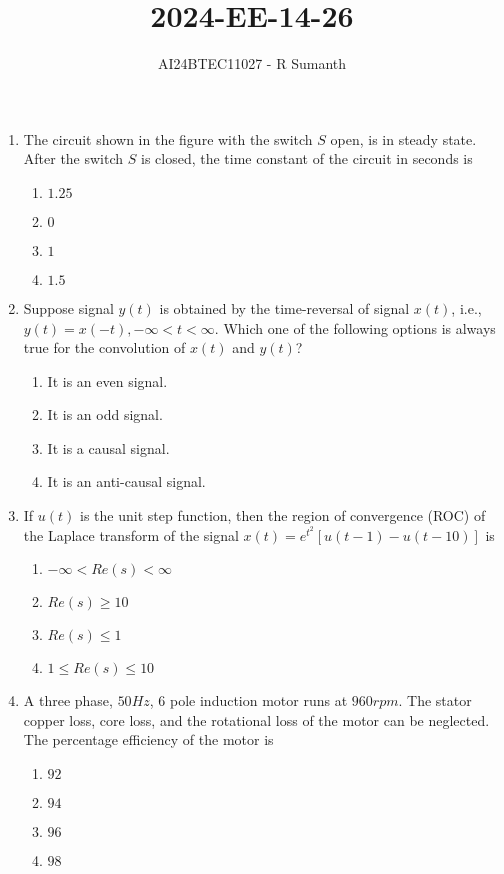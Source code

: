\documentclass[journal,12pt,onecolumn]{IEEEtran}
\theoremstyle{remark}
\begin{document}

\vspace{3cm}

\title{\textbf{2024-EE-14-26}}
\author{AI24BTEC11027 - R Sumanth}
\maketitle
\bigskip

\renewcommand{\thefigure}{\theenumi}
\renewcommand{\thetable}{\theenumi}
\setlength{\columnsep}{2.5em}
\begin{enumerate}

\item The circuit shown in the figure with the switch $S$ open, is in steady state. After the 
switch $S$ is closed, the time constant of the circuit in seconds is

\begin{enumerate}
    \item $1.25$
    \item $0$
    \item $1$
    \item $1.5$\\
\end{enumerate}

\item Suppose signal $y(t)$ is obtained by the time-reversal of signal $x(t)$, i.e., $y(t)=x(-t),-\infty<t<\infty.$ Which one of the following options is always true for the convolution of $x(t)$ and $y(t)$?
\begin{enumerate}
    \item It is an even signal.
    \item It is an odd signal. 
    \item It is a causal signal.
    \item It is an anti-causal signal. \\
\end{enumerate}

\item If $u(t)$ is the unit step function, then the region of convergence (ROC) of the 
Laplace transform of the signal $x(t)=e^{t^2}[u(t-1)-u(t-10)]$ is
\begin{enumerate}
    \item $-\infty < Re(s) <\infty$
    \item $Re(s)\geq 10$
    \item $Re(s)\leq1$
    \item $1\leq Re(s) \leq10$ \\
\end{enumerate}
\item A three phase, $50 Hz$, $6$ pole induction motor runs at $960 rpm$. The stator copper 
loss, core loss, and the rotational loss of the motor can be neglected. The percentage 
efficiency of the motor is
\begin{enumerate}
    \item $92$
    \item $94$
    \item $96$
    \item $98$\\
\end{enumerate}


\end{enumerate}
\end{document}
